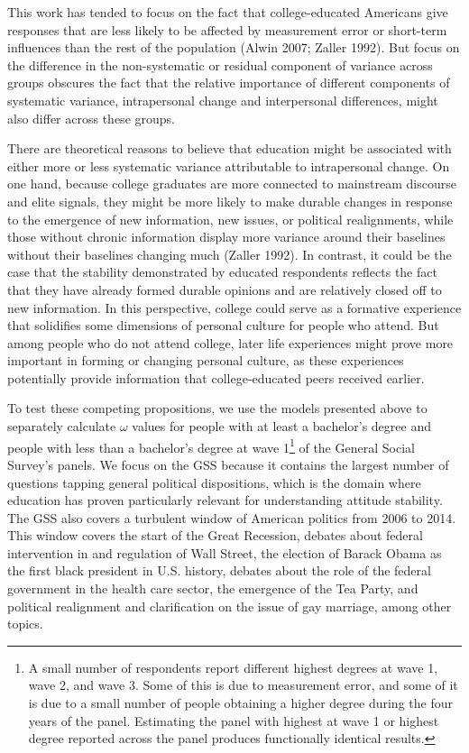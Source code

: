 \documentclass[
  12pt,
]{article}
\begin{document}
This work has tended to focus on the fact that college-educated
Americans give responses that are less likely to be affected by
measurement error or short-term influences than the rest of the
population (Alwin 2007; Zaller 1992). But focus on the difference in the
non-systematic or residual component of variance across groups obscures
the fact that the relative importance of different components of
systematic variance, intrapersonal change and interpersonal differences,
might also differ across these groups.

There are theoretical reasons to believe that education might be
associated with either more or less systematic variance attributable to
intrapersonal change. On one hand, because college graduates are more
connected to mainstream discourse and elite signals, they might be more
likely to make durable changes in response to the emergence of new
information, new issues, or political realignments, while those without
chronic information display more variance around their baselines without
their baselines changing much (Zaller 1992). In contrast, it could be
the case that the stability demonstrated by educated respondents
reflects the fact that they have already formed durable opinions and are
relatively closed off to new information. In this perspective, college
could serve as a formative experience that solidifies some dimensions of
personal culture for people who attend. But among people who do not
attend college, later life experiences might prove more important in
forming or changing personal culture, as these experiences potentially
provide information that college-educated peers received earlier.

To test these competing propositions, we use the models presented above
to separately calculate \(\omega\) values for people with at least a
bachelor's degree and people with less than a bachelor's degree at wave
1\footnote{A small number of respondents report different highest
  degrees at wave 1, wave 2, and wave 3. Some of this is due to
  measurement error, and some of it is due to a small number of people
  obtaining a higher degree during the four years of the panel.
  Estimating the panel with highest at wave 1 or highest degree reported
  across the panel produces functionally identical results.} of the
General Social Survey's panels. We focus on the GSS because it contains
the largest number of questions tapping general political dispositions,
which is the domain where education has proven particularly relevant for
understanding attitude stability. The GSS also covers a turbulent window
of American politics from 2006 to 2014. This window covers the start of
the Great Recession, debates about federal intervention in and
regulation of Wall Street, the election of Barack Obama as the first
black president in U.S. history, debates about the role of the federal
government in the health care sector, the emergence of the Tea Party,
and political realignment and clarification on the issue of gay
marriage, among other topics.
\end{document}
